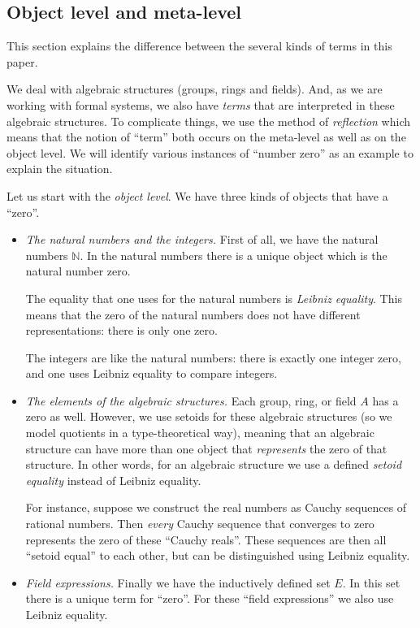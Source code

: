 \documentclass[numreferences]{kluwer}
\newcommand{\nat}{{\mathbb N}}
\begin{document}
\begin{article}
\subsection{Object level and meta-level}\label{levels}

This section explains the difference between the several kinds of terms
in this paper.

We deal with algebraic structures (groups, rings
and fields).
And, as we are working with formal systems, we also have
\emph{terms} that are interpreted in these algebraic structures.
To complicate things, we use the method of \emph{reflection}
which means that the notion of ``term'' both occurs on
the meta-level as well as on the object level.
We will identify various instances of ``number zero'' as an example to explain
the situation.

Let us start with the \emph{object level}.
We have three kinds of objects that have a ``zero''.
\begin{itemize}
\item
\emph{The natural numbers and the integers.}
First of all, we have the natural numbers $\nat$.
In the natural numbers there is a unique object which is the natural number
zero.

The equality that one uses for the natural numbers
is \emph{Leibniz equality}.
This means that the zero of the natural numbers does not have
different representations:
there is only one zero.

The integers are like the natural numbers:
there is exactly one integer zero, and one uses Leibniz equality
to compare integers.

\item
\emph{The elements of the algebraic structures.}
Each group, ring, or field $A$ has a zero as well.  However, we use
setoids for these algebraic structures (so we model
quotients in a type-theoretical way), meaning that an algebraic
structure can have more than one object that \emph{represents} the
zero of that structure.  In other words, for an algebraic structure we
use a defined \emph{setoid equality} instead of Leibniz equality.

For instance, suppose we construct the real numbers as Cauchy
sequences of rational numbers.
Then \emph{every} Cauchy sequence that converges to zero represents the
zero of these ``Cauchy reals''.
These sequences are then all ``setoid equal'' to each other, but can
be distinguished using Leibniz equality.

\item
\emph{Field expressions.}
Finally we have the inductively defined set $E$.
In this set there is a unique term for ``zero''.
For these ``field expressions'' we also use Leibniz equality.


\end{itemize}
\end{article}
\end{document}
